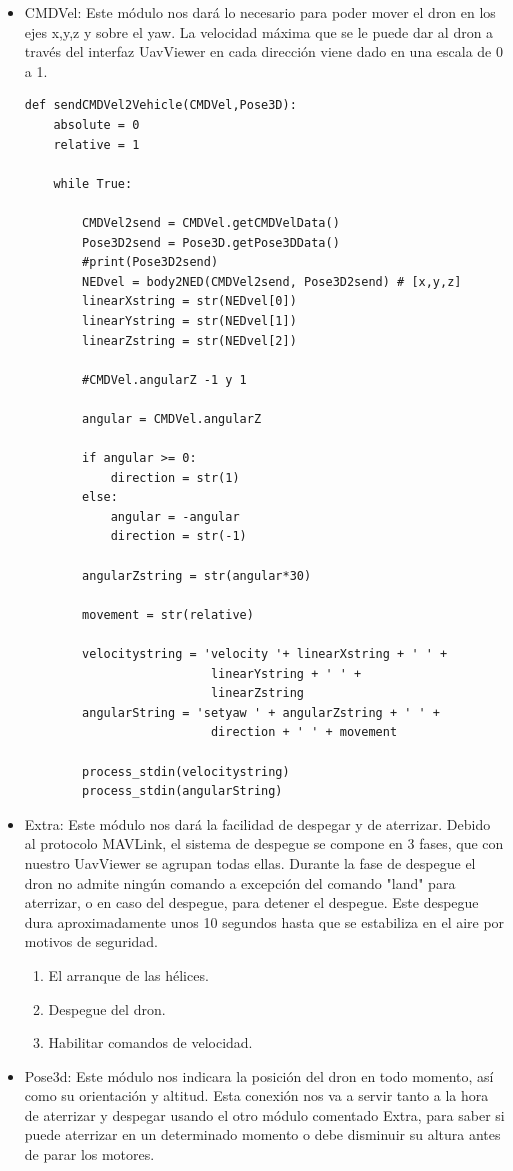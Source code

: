 \begin{itemize}
\item CMDVel: Este módulo nos dará lo necesario para poder mover el dron en los ejes x,y,z y sobre el yaw. La velocidad máxima que se le puede dar al dron a través del interfaz UavViewer en cada dirección viene dado en una escala de 0 a 1.  
\begin{lstlisting}[frame=single]
def sendCMDVel2Vehicle(CMDVel,Pose3D):
    absolute = 0
    relative = 1

    while True:

        CMDVel2send = CMDVel.getCMDVelData()
        Pose3D2send = Pose3D.getPose3DData()
        #print(Pose3D2send)
        NEDvel = body2NED(CMDVel2send, Pose3D2send) # [x,y,z]
        linearXstring = str(NEDvel[0])
        linearYstring = str(NEDvel[1])
        linearZstring = str(NEDvel[2])

        #CMDVel.angularZ -1 y 1

        angular = CMDVel.angularZ

        if angular >= 0:
            direction = str(1)
        else:
            angular = -angular
            direction = str(-1)

        angularZstring = str(angular*30)

        movement = str(relative)

        velocitystring = 'velocity '+ linearXstring + ' ' + 
        				  linearYstring + ' ' + 
                          linearZstring
        angularString = 'setyaw ' + angularZstring + ' ' + 
        				  direction + ' ' + movement

        process_stdin(velocitystring) 
        process_stdin(angularString)
\end{lstlisting}
\item Extra: Este módulo nos dará la facilidad de despegar y de aterrizar. Debido al protocolo MAVLink, el sistema de despegue se compone en 3 fases, que con nuestro UavViewer se agrupan todas ellas. Durante la fase de despegue el dron no admite ningún comando a excepción del comando "land" para aterrizar, o en caso del despegue, para detener el despegue.  Este despegue dura aproximadamente unos 10 segundos hasta que se estabiliza en el aire por motivos de seguridad. \begin{enumerate}
						\item El arranque de las hélices. 
                        \item Despegue del dron.
                        \item Habilitar comandos de velocidad.
						\end{enumerate}
\item Pose3d: Este módulo nos indicara la posición del dron en todo momento, así como su orientación y altitud. Esta conexión nos va a servir tanto a la hora de aterrizar y despegar usando el otro módulo comentado Extra, para saber si puede aterrizar en un determinado momento o debe disminuir su altura antes de parar los motores.

\end{itemize}

